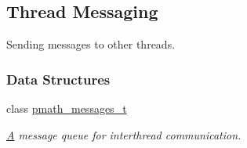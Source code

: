 \hypertarget{group__threadmsg}{
\subsection{Thread Messaging}
\label{group__threadmsg}
}
Sending messages to other threads.  


\subsubsection*{Data Structures}
\begin{CompactItemize}
\item 
class \hyperlink{classpmath__messages__t}{pmath\_\-messages\_\-t}
\begin{CompactList}\small\item\em \hyperlink{class_a}{A} message queue for interthread communication. \item\end{CompactList}\end{CompactItemize}
